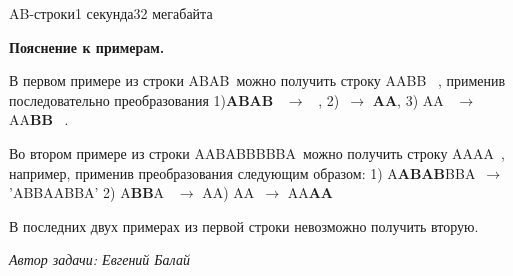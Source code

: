 \documentclass[11pt,a4paper,oneside]{article}
\newcommand{\qo}{\textquotesingle}
\newcommand{\qq}{\textquotesingle~}
\begin{document}
\begin{problem}{AB-строки}{1 секунда}{32 мегабайта}
\Examples

\begin{example}%
%
\end{example}

\vspace{0.3cm}
\medskip\noindent
\textbf{Пояснение к примерам.}

В первом примере из строки \qo ABAB\qq можно получить строку \qo AABB \qq, применив последовательно преобразования 1)\qo \textbf{ABAB} \qq $\to$ \qo \qq, 2)\qo \qq $\to$ \textbf{AA},
3) \qo AA \qq $\to$ \qo AA\textbf{BB} \qq. 

Во втором примере из строки \qo AABABBBBBA\qq можно получить строку \qo AAAA\qq, например, применив преобразования  следующим образом:
1) \qo A\textbf{ABAB}BBA\qq $\to$ 'ABBAABBA'
2) \qo A\textbf{BB}A \qq $\to$ \qo AA\qo 
3) \qo AA\qq $\to$ \qo AA\textbf{AA}\qq

В последних двух примерах из первой строки невозможно получить вторую. 





\vspace{1.0cm}
\hfill \textit{Автор задачи: Евгений Балай}
\medskip\noindent




\end{problem}
\end{document}
